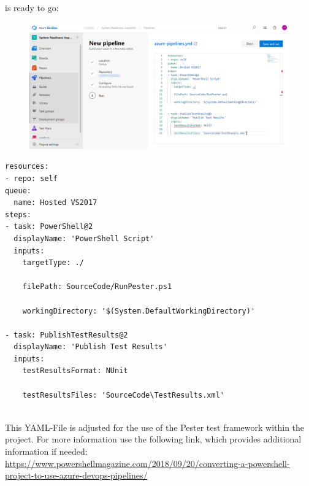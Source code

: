 is ready to go:
\begin{figure}[H]
    \centering
    \includegraphics[width=0.7\linewidth]{../developer_manual/assets/devops4.png}
\end{figure}

\begin{lstlisting}
resources:
- repo: self
queue:
  name: Hosted VS2017
steps:
- task: PowerShell@2
  displayName: 'PowerShell Script'
  inputs:
    targetType: ./

    filePath: SourceCode/RunPester.ps1

    workingDirectory: '$(System.DefaultWorkingDirectory)'

- task: PublishTestResults@2
  displayName: 'Publish Test Results'
  inputs:
    testResultsFormat: NUnit

    testResultsFiles: 'SourceCode\TestResults.xml'
\end{lstlisting}\ \\
This YAML-File is adjusted for the use of the Pester test framework within the project. For more information use the following link, which provides additional information if needed:
\\
\url{https://www.powershellmagazine.com/2018/09/20/converting-a-powershell-project-to-use-azure-devops-pipelines/}